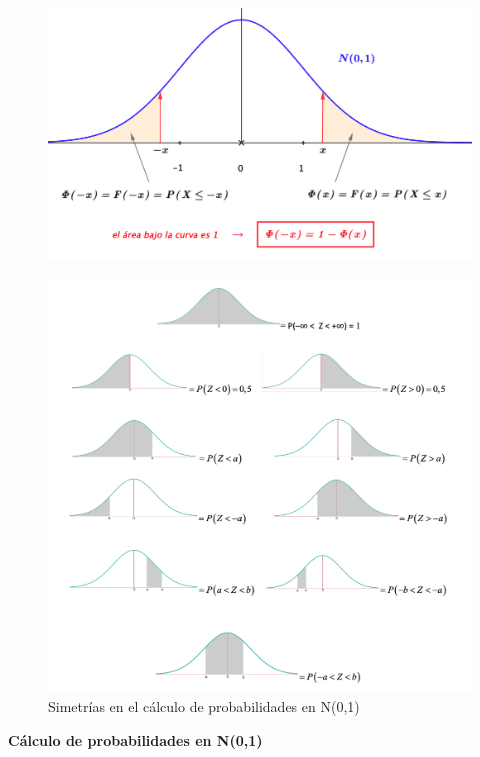 	\begin{figure}[H]
	\centering
	\includegraphics[width=.7\textwidth]{imagenes/imagenes04/T04IM15.png}
	\end{figure}

	\begin{figure}[H]
	\centering
	\includegraphics[width=1\textwidth]{imagenes/imagenes04/T04IM16.png}
	\caption*{\small{Simetrías en el cálculo de probabilidades en N(0,1)}}
	\end{figure}

\newpage







\newpage
\begin{large} \textbf{Cálculo de probabilidades en N(0,1)} \end{large}

